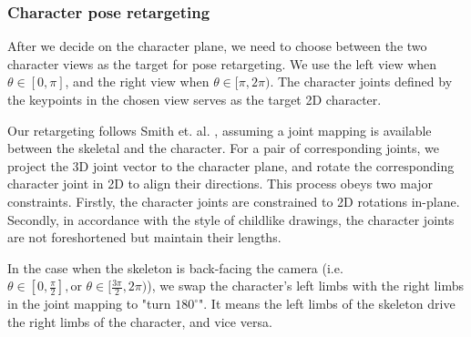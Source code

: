 




\subsubsection{Character pose retargeting}
\label{sec:retarget-pose}

After we decide on the character plane, we need to choose between the two character views as the target for pose retargeting. We use the left view when $\theta \in [0, \pi]$, and the right view when $\theta \in [\pi, 2\pi)$. The character joints defined by the keypoints in the chosen view serves as the target 2D character.

Our retargeting follows Smith et. al. \cite{SmithHodgins}, assuming a joint mapping is available between the skeletal and the character. For a pair of corresponding joints, we project the 3D joint vector to the character plane, and rotate the corresponding character joint in 2D to align their directions. This process obeys two major constraints. Firstly, the character joints are constrained to 2D rotations in-plane. Secondly, in accordance with the style of childlike drawings, the character joints are not foreshortened but maintain their lengths.

In the case when the skeleton is back-facing the camera (i.e. $\theta \in [0, \frac{\pi}{2}], \text{or } \theta \in [\frac{3\pi}{2}, 2\pi)$), we swap the character's left limbs with the right limbs in the joint mapping to "turn $180^{\circ}$". It means the left limbs of the skeleton drive the right limbs of the character, and vice versa.

